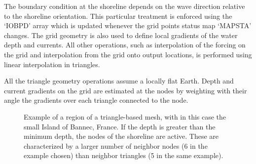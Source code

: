 The boundary condition at the shoreline depends on the wave direction
relative to the shoreline orientation. This particular treatment is enforced
using the `{\code IOBPD}' array which is updated whenever the grid points
status map `{\code MAPSTA}' changes. The grid geometry is also used to define
local gradients of the water depth and currents. All other operations, such as
interpolation of the forcing on the grid and interpolation from the grid onto
output locations, is performed using linear interpolation in triangles.

All the triangle geometry operations assume a locally flat Earth. Depth and
current gradients on the grid are estimated at the nodes by weighting with
their angle the gradients over each triangle connected to the node.

\begin{figure} \begin{center}
\caption{Example of a region of a triangle-based mesh, with in this case the
 small Island of Bannec, France. If the depth is greater than the minimum
depth, the nodes of the shoreline are active. These are characterized by a
larger number of neighbor nodes (6 in the example chosen) than neighbor
triangles (5 in the same example).}
\label{fig:triangles} \botline
\end{center}
\end{figure}

